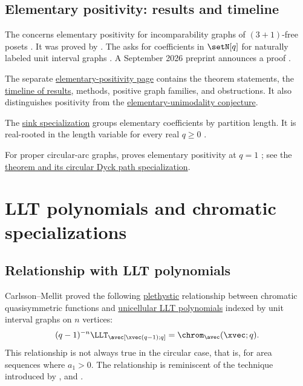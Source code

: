 \subsection[chromaticQuasisymmetricElementaryExpansion]{Elementary positivity: results and timeline}

The \label{stanleyStembridgeConjecture}
concerns elementary positivity for incomparability graphs of $(3+1)$-free
posets \cite{StanleyStembridge1993,Stanley1995}. It was proved by
 \cite{Hikita2024x}.
The \label{shareshianWachsConjecture}
asks for coefficients in $\setN[q]$ for naturally labeled unit interval
graphs \cite{ShareshianWachs2012,ShareshianWachs2016}. A September 2026
preprint announces a proof \cite{OpenAI2026ChromaticPositivity}.

The separate \hyperref[chromaticEexpansion]{elementary-positivity page}
contains the theorem statements, the
\hyperref[chromaticEExpansionChronology]{timeline of results}, methods,
positive graph families, and obstructions. It also distinguishes positivity
from the \hyperref[chromaticEUnimodalityConjecture]{elementary-unimodality
conjecture}.

The \hyperref[chromaticSinkRealRooted]{sink specialization} groups elementary
coefficients by partition length. It is real-rooted in the length variable
for every real $q\geq0$ \cite[Thm.~5.2]{AlexanderssonLeite2026x}.

\label{properCircularArcEPositive}
For proper circular-arc graphs,  proves elementary
positivity at $q=1$ \cite{Vailaya2026x}; see the
\hyperref[chromaticECircularTheorem]{theorem and its circular Dyck path
specialization}.


\section[chromaticQuasisymmetricConnections]{LLT polynomials and chromatic specializations}


\subsection[chromaticQuasisymmetricLLT]{Relationship with LLT polynomials}

Carlsson--Mellit \cite[Prop.~3.4]{CarlssonMellit2017} proved the following
\hyperref[plethysm]{plethystic} relationship between chromatic
quasisymmetric functions and \hyperref[LLT]{unicellular LLT polynomials}
indexed by unit interval graphs
on $n$ vertices:
\[
(q-1)^{-n} \LLT_\avec[\xvec(q-1);q] =  \chrom_\avec(\xvec;q).
\]
This relationship is not always true in the circular case, that is, for area sequences where $a_1 \gt 0$.
The relationship is reminiscent of the technique
introduced by , 
and  \cite{HaglundHaimanLoehr2005}.

